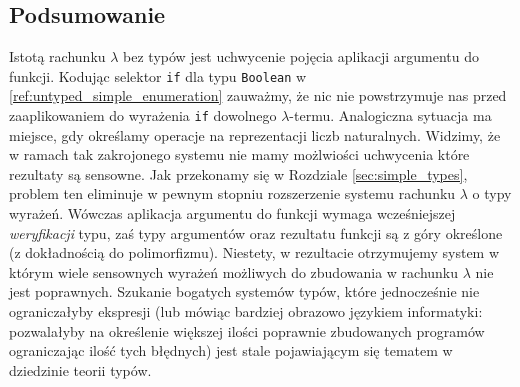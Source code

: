 \subsection{Podsumowanie}
Istotą rachunku \(\lambda\) bez typów jest uchwycenie pojęcia aplikacji argumentu do funkcji. Kodując selektor \texttt{if} dla typu \texttt{Boolean} w \ref{ref:untyped_simple_enumeration} zauważmy, że nic nie powstrzymuje nas przed zaaplikowaniem do wyrażenia \texttt{if} dowolnego \(\lambda\)-termu. Analogiczna sytuacja ma miejsce, gdy określamy operacje na reprezentacji liczb naturalnych. Widzimy, że w ramach tak zakrojonego systemu nie mamy możlwiości uchwycenia które rezultaty są sensowne. Jak przekonamy się w Rozdziale \ref{sec:simple_types}, problem ten eliminuje w pewnym stopniu rozszerzenie systemu rachunku \(\lambda\) o typy wyrażeń. Wówczas aplikacja argumentu do funkcji wymaga wcześniejszej \emph{weryfikacji} typu, zaś typy argumentów oraz rezultatu funkcji są z góry określone (z dokładnością do polimorfizmu). Niestety, w rezultacie otrzymujemy system w którym wiele sensownych wyrażeń możliwych do zbudowania w rachunku \(\lambda\) nie jest poprawnych. Szukanie bogatych systemów typów, które jednocześnie nie ograniczałyby ekspresji (lub mówiąc bardziej obrazowo językiem informatyki: pozwalałyby na określenie większej ilości poprawnie zbudowanych programów ograniczając ilość tych błędnych) jest stale pojawiającym się tematem w dziedzinie teorii typów.
